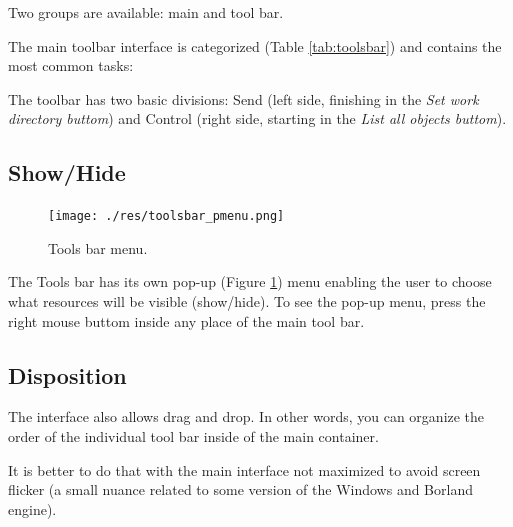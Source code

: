 Two groups are available: main and \RR{} tool bar.

The main toolbar interface is categorized
(Table \ref{tab:toolsbar})
and contains the most common tasks:

The \RR{} toolbar has two basic divisions: Send (left side, finishing in the
\textit{Set work directory buttom}) and Control (right side, starting
in the \textit{List all objects buttom}).


\hypertarget{working_toolsbar_showhide}{}
\subsection{Show/Hide}

\begin{figure}[H]
  \texttt{[image: ./res/toolsbar\_pmenu.png]}\\
  \caption{Tools bar menu.}
  \label{fig:toolsbar_pmenu}
\end{figure}

The Tools bar has its own pop-up
(Figure \ref{fig:toolsbar_pmenu})
menu enabling the user to choose what
resources will be visible (show/hide). To see the pop-up menu, press the
right mouse buttom inside any place of the main tool bar.


\hypertarget{working_toolsbar_disposition}{}
\subsection{Disposition}

The interface also allows drag and drop. In other words, you can organize
the order of the individual tool bar inside of the main container.

It is better to do that with the main interface not maximized to avoid
screen flicker (a small nuance related to some version of the Windows
and Borland engine).
